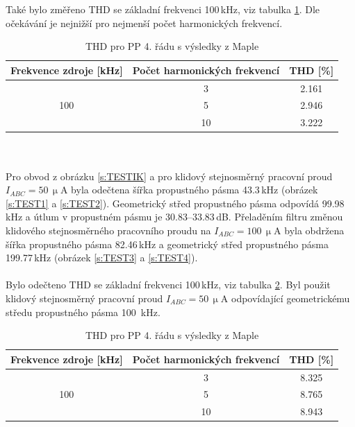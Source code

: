 \noindent Také bylo změřeno THD se základní frekvenci 100\,kHz, viz tabulka \ref{s:THD333}. Dle očekávání je nejnižší pro nejmenší počet harmonických frekvencí.
\begin{table}[h]
\centering
\renewcommand{\arraystretch}{1.15}
  \begin{tabular}{ | c | c | c |}
    \hline
    Frekvence zdroje [kHz] & Počet harmonických frekvencí & THD [\%] \\ \hline
	\multirow{3}{*}{100} & 3 & 2.161\\& 5 & 2.946 \\& 10 & 3.222 \\ \hline
  \end{tabular}
  \caption[THD pro PP 4. řádu (Maple)]{THD pro PP 4. řádu s výsledky z Maple \label{s:THD333}}
\end{table}
\\
\\
Pro obvod z obrázku \ref{s:TESTIK} a pro klidový stejnosměrný pracovní proud $I_{ABC} = 50$\,$\upmu$A byla odečtena šířka propustného pásma 43.3\,kHz (obrázek \ref{s:TEST1} a \ref{s:TEST2}). Geometrický střed propustného pásma odpovídá 99.98\,kHz a útlum v propustném pásmu je 30.83--33.83\,dB. Přeladěním filtru změnou klidového stejnosměrného pracovního proudu na $I_{ABC} = 100$\,$\upmu$A byla obdržena šířka propustného pásma 82.46\,kHz a geometrický střed propustného pásma 199.77\,kHz (obrázek \ref{s:TEST3} a \ref{s:TEST4}). \\
\\
Bylo odečteno THD se základní frekvenci 100\,kHz, viz tabulka \ref{s:THD334}. Byl použit klidový stejnosměrný pracovní proud $I_{ABC} = 50$\,$\upmu$A odpovídající geometrickému středu propustného pásma 100~kHz.
\begin{table}[h]
\centering
\renewcommand{\arraystretch}{1.15}
  \begin{tabular}{ | c | c | c |}
    \hline
    Frekvence zdroje [kHz] & Počet harmonických frekvencí & THD [\%] \\ \hline
	\multirow{3}{*}{100} & 3 & 8.325\\& 5 & 8.765 \\& 10 & 8.943 \\ \hline
  \end{tabular}
  \caption[THD pro PP 4. řádu (Maple)]{THD pro PP 4. řádu s výsledky z Maple \label{s:THD334}}
\end{table}
